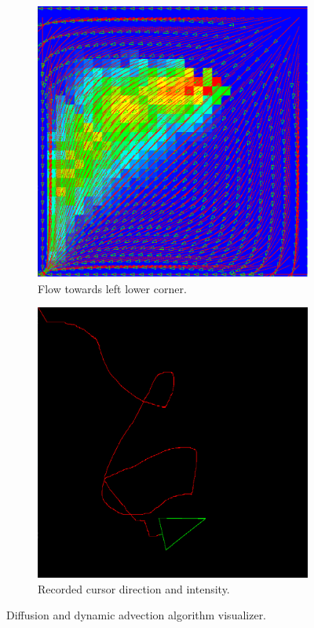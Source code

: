 \documentclass[12pt, titlepage]{article}
\begin{document}
\begin{figure}[h!]
  \centering
  \begin{subfigure}[b]{0.4\linewidth}
    \includegraphics[width=\linewidth]{images/sim3.png}
    \caption{Flow towards left lower corner.}
    \label{fig:flows}
  \end{subfigure}
  \begin{subfigure}[b]{0.4\linewidth}
    \includegraphics[width=\linewidth]{images/cursor.png}
    \caption{Recorded cursor direction and intensity.}
    \label{fig:cursor-movement}
  \end{subfigure}
  \caption{Diffusion and dynamic advection algorithm visualizer.}
  \label{fig:left flow with cursor follow}
\end{figure}
\end{document}
